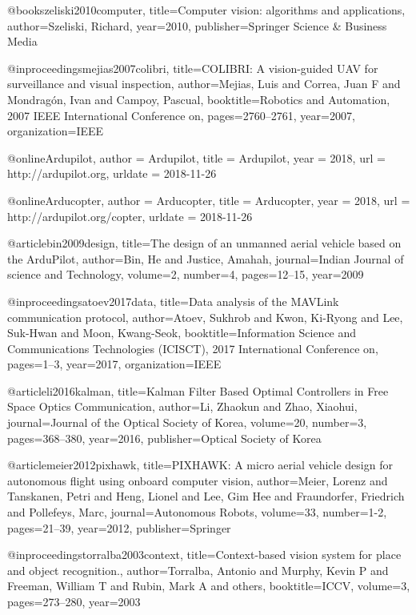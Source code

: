 @book{szeliski2010computer,
  title={Computer vision: algorithms and applications},
  author={Szeliski, Richard},
  year={2010},
  publisher={Springer Science \& Business Media}
}

@inproceedings{mejias2007colibri,
  title={COLIBRI: A vision-guided UAV for surveillance and visual inspection},
  author={Mejias, Luis and Correa, Juan F and Mondrag{\'o}n, Ivan and Campoy, Pascual},
  booktitle={Robotics and Automation, 2007 IEEE International Conference on},
  pages={2760--2761},
  year={2007},
  organization={IEEE}
}

@online{Ardupilot,
  author = {Ardupilot},
  title = {Ardupilot},
  year = 2018,
  url = {http://ardupilot.org},
  urldate = {2018-11-26}
}

@online{Arducopter,
  author = {Arducopter},
  title = {Arducopter},
  year = 2018,
  url = {http://ardupilot.org/copter},
  urldate = {2018-11-26}
}

@article{bin2009design,
  title={The design of an unmanned aerial vehicle based on the ArduPilot},
  author={Bin, He and Justice, Amahah},
  journal={Indian Journal of science and Technology},
  volume={2},
  number={4},
  pages={12--15},
  year={2009}
}

@inproceedings{atoev2017data,
  title={Data analysis of the MAVLink communication protocol},
  author={Atoev, Sukhrob and Kwon, Ki-Ryong and Lee, Suk-Hwan and Moon, Kwang-Seok},
  booktitle={Information Science and Communications Technologies (ICISCT), 2017 International Conference on},
  pages={1--3},
  year={2017},
  organization={IEEE}
}

@article{li2016kalman,
  title={Kalman Filter Based Optimal Controllers in Free Space Optics Communication},
  author={Li, Zhaokun and Zhao, Xiaohui},
  journal={Journal of the Optical Society of Korea},
  volume={20},
  number={3},
  pages={368--380},
  year={2016},
  publisher={Optical Society of Korea}
}

@article{meier2012pixhawk,
  title={PIXHAWK: A micro aerial vehicle design for autonomous flight using onboard computer vision},
  author={Meier, Lorenz and Tanskanen, Petri and Heng, Lionel and Lee, Gim Hee and Fraundorfer, Friedrich and Pollefeys, Marc},
  journal={Autonomous Robots},
  volume={33},
  number={1-2},
  pages={21--39},
  year={2012},
  publisher={Springer}
}

@inproceedings{torralba2003context,
  title={Context-based vision system for place and object recognition.},
  author={Torralba, Antonio and Murphy, Kevin P and Freeman, William T and Rubin, Mark A and others},
  booktitle={ICCV},
  volume={3},
  pages={273--280},
  year={2003}
}

